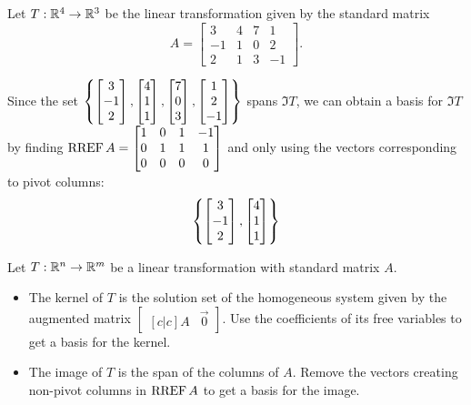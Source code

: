 \begin{observation}
Let \(T: \mathbb{R}^4 \rightarrow \mathbb{R}^3\) be the linear transformation given by the
standard matrix
\[
  A
    =
  \begin{bmatrix} 3 & 4 & 7 & 1\\ -1 & 1 & 0 & 2 \\ 2 & 1 & 3 & -1 \end{bmatrix}
.\]

Since the set
\(
  \left\{
    \begin{bmatrix}3\\-1\\2\end{bmatrix},
    \begin{bmatrix}4\\1\\1\end{bmatrix},
    \begin{bmatrix}7\\0\\3\end{bmatrix},
    \begin{bmatrix}1\\2\\-1\end{bmatrix}
  \right\}
\)
spans \(\Im T\), we can obtain a basis for \(\Im T\) by finding
\(
  \operatorname{RREF} A
    =
  \begin{bmatrix} 1 & 0 & 1 & -1\\ 0 & 1 & 1 & 1 \\ 0 & 0 & 0 & 0 \end{bmatrix}
\)
and only using the vectors corresponding to pivot columns:
\[
  \left\{
    \begin{bmatrix}3\\-1\\2\end{bmatrix},
    \begin{bmatrix}4\\1\\1\end{bmatrix}
  \right\}
\]
\end{observation}

\begin{fact}
Let  \(T:\mathbb{R}^n\to\mathbb{R}^m\) be a linear transformation with standard matrix \(A\).

\begin{itemize}
\item The kernel of \(T\) is the solution set of the homogeneous system given
by the augmented matrix \(\begin{bmatrix}[c|c]A&\vec 0\end{bmatrix}\).
Use the coefficients of its free variables to get a basis for the kernel.
\item The image of \(T\) is the span of the columns of \(A\). Remove
the vectors creating non-pivot columns in \(\operatorname{RREF} A\) to get a basis
for the image.
\end{itemize}
\end{fact}


